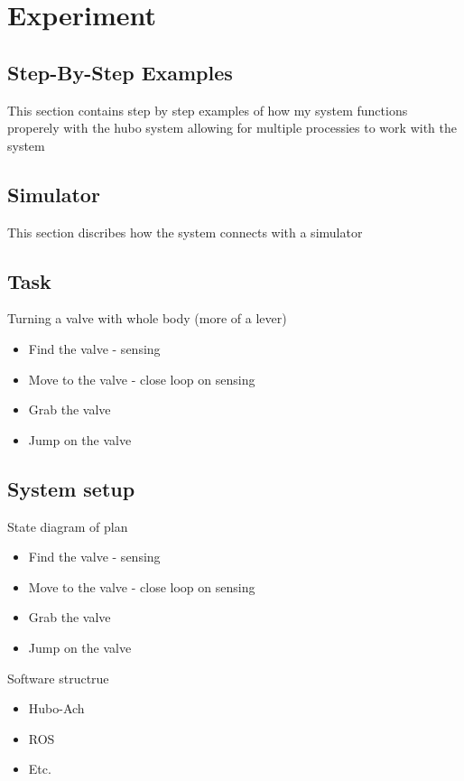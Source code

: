 \section{Experiment}
\subsection{Step-By-Step Examples}\label{sec:simpleExamples}
This section contains step by step examples of how my system functions properely with the hubo system allowing for multiple processies to work with the system
\subsection{Simulator}\label{sec:simulator}
This section discribes how the system connects with a simulator 


\subsection{Task}\label{sec:task}
Turning a valve with whole body (more of a lever)
\begin{itemize}
\item Find the valve - sensing
\item Move to the valve - close loop on sensing
\item Grab the valve
\item Jump on the valve
\end{itemize}



\subsection{System setup}

State diagram of plan
\begin{itemize}
\item Find the valve - sensing
\item Move to the valve - close loop on sensing
\item Grab the valve
\item Jump on the valve
\end{itemize}

Software structrue
\begin{itemize}
\item Hubo-Ach
\item ROS
\item Etc.
\end{itemize}


